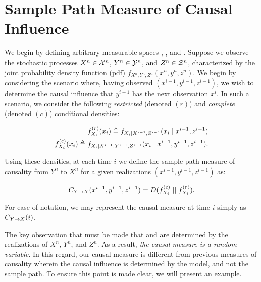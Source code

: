 \section{Sample Path Measure of Causal Influence}

\begin{comment}
- Definition
- True causal measure is random
- Can be applied to time varying settings
- Always non-negative
- Is always well defined (as opposed to directed information rate)
- ``Semi-local'' - Measure such as DI and TE are functions of the model (can't capture local influence), but local measures like pointwise mutual information can be negative. Our measure is local and positive.
\end{comment}

We begin by defining arbitrary measurable spaces , , and . Suppose we observe the stochastic processes $X^n \in \mathcal{X}^n$, $Y^n \in \mathcal{Y}^n$, and $Z^n \in \mathcal{Z}^n$, characterized by the joint probability density function (pdf) $f_{X^n,Y^n,Z^n}(x^n,y^n,z^n)$. We begin by considering the scenario where, having observed $(x^{i-1},y^{i-1},z^{i-1})$, we wish to determine the causal influence that $y^{i-1}$ has the next observation $x^i$. In such a scenario, we consider the following \emph{restricted} (denoted $(r)$) and \emph{complete} (denoted $(c)$) conditional densities:

\begin{eqnarray}
f_{X_i}^{(r)}(x_i) \triangleq f_{X_i \mid X^{i-1},Z^{i-1}}
    (x_i \mid x^{i-1},z^{i-1}) \\
f_{X_i}^{(c)}(x_i) \triangleq f_{X_i \mid X^{i-1},Y^{i-1},Z^{i-1}}
    (x_i \mid x^{i-1},y^{i-1},z^{i-1}).
\end{eqnarray}

\noindent Using these densities, at each time $i$ we define the sample path measure of causality from $Y^n$ to $X^n$ for a given realizations $(x^{i-1},y^{i-1},z^{i-1})$ as:

\begin{equation}
C_{Y\rightarrow X}(x^{i-1},y^{i-1},z^{i-1}) = D(f_{X_i}^{(c)} \mid \mid f_{X_i}^{(r)}).
\end{equation}

\noindent For ease of notation, we may represent the causal measure at time $i$ simply as $C_{Y\rightarrow X}(i)$.

The key observation that must be made that  and  are determined by the realizations of $X^n$, $Y^n$, and $Z^n$. As a result, \emph{the causal measure is a random variable}. In this regard, our causal measure is different from previous measures of causality wherein the causal influence is determined by the model, and not the sample path. To ensure this point is made clear, we will present an example.

